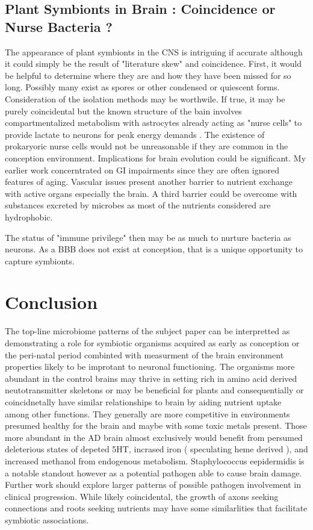 \documentclass[aps,secnumarabic,balancelastpage,amsmath,amssymb,nofootinbib]{revtex4}
\begin{document}
\subsection{ Plant Symbionts in Brain : Coincidence or Nurse Bacteria ?  }


The appearance of plant symbionts in the CNS is
intriguing if accurate although it could simply
be the result of "literature skew" and coincidence.
First, it would be helpful
to determine where they are and how they have been
missed for so long. Possibly many exist as spores or 
other condensed or quiescent forms. Consideration of the
isolation methods may be worthwile. If true, it may 
be purely coincidental but the known structure of the bain
involves compartmentalized metabolism with astrocytes
already acting as "nurse cells" to provide lactate
to neurons for peak energy demands
\cite{PMID12742077}. The existence of prokaryoric nurse
cells would not be unreasonable if they are common in 
the conception environment. Implications for brain
evolution could be significant.  
My earlier work concerntrated on GI impairments since
they are often ignored features of aging. Vascular
issues present another barrier to nutrient exchange with
active organs especially the brain. A third barrier could
be overcome with substances excreted by microbes as
most of the nutrients considered are hydrophobic.  

The status of "immune privilege" \cite{Proulx_Engelhardt_Central_nervous_system_zoning_2022}
 then may be as much
to nurture bacteria as neurons.  As a BBB  does not exist at conception,
that is a unique opportunity to capture symbionts. 





\section{Conclusion}
The top-line microbiome patterns of the subject paper 
\cite{10.3389/fcimb.2023.1123228} 
can be interpretted as demonstrating a role for symbiotic organisms
acquired as early as conception or the peri-natal period 
combinted with  measurment of  the brain environment properties likely to be
improtant to neuronal functioning. 
The organisms more abundant
in the control brains 
may thrive in setting rich in amino acid derived neutotransmitter
skeletons or 
may be beneficial for plants and consequentially
or coincidnetally have similar relationships to brain 
by aiding nutrient uptake among other functions. They
generally are more competitive in environments presumed
healthy for the brain and maybe with some toxic metals present. 
Those more abundant in the AD brain almost exclusively 
would benefit from persumed deleterious states of 
depeted 5HT, incrased iron ( speculating heme derived ),
and increased methanol from endogenous metabolism. 
Staphylococcus eepidermidis is a notable standout however
as a potential pathogen able to cause brain damage.
Further work should explore larger patterns of possible pathogen
involvement in clinical progression.  
While likely coincidental,  the growth of axons
seeking connections and roots seeking nutrients 
may have some similarlities that facilitate
symbiotic associations. 
\end{document}
